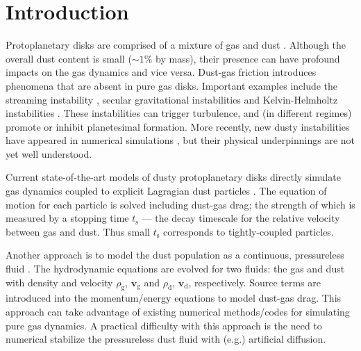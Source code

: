 \documentclass[iop, numberedappendix]{emulateapj}
\newcommand{\rhod}{\rho_\mathrm{d}}
\newcommand{\rhog}{\rho_\mathrm{g}}
\newcommand{\tstop}{t_\mathrm{s}}
\begin{document}
\section{Introduction}
Protoplanetary disks are comprised of a mixture of gas and dust
\citep{chiang10}. Although the overall dust content is small
($\sim 1\%$ by mass), their presence can have profound impacts on the 
gas dynamics and vice versa. Dust-gas friction introduces phenomena
that are absent in pure gas disks. Important examples include the
streaming instability 
\citep[SI,][]{youdin05a,youdin07b,johansen07}, secular gravitational
instabilities \citep[SGI,][]{ward00,youdin11,michikoshi12,takahashi14} and
Kelvin-Helmholtz instabilities
\citep{goldreich1973, chiang08,barranco09,lee10}. These instabilities 
can trigger turbulence, and (in different regimes) promote or inhibit 
planetesimal formation. 
More recently, new 
dusty instabilities have appeared in numerical
simulations \citep{loren15,loren16,lamb16}, but their physical underpinnings are not yet well
understood. 



Current state-of-the-art models of dusty protoplanetary
disks directly simulate gas dynamics coupled to explicit
Lagragian dust particles
\citep{johansen2006, nelson10,bai10,yang14,zhu14,gibbons15,simon16,baruteau16}. 
The equation of motion for each particle is solved 
including dust-gas drag; the strength of which is measured 
by a stopping time $\tstop$ --- the decay timescale for the 
relative velocity between gas and dust. Thus small $\tstop$
corresponds to tightly-coupled particles. 


Another approach is to model the dust population as a continuous, pressureless
fluid 
\citep{paardekooper06b,meheut12,laibe12,loren14,fu14b,surville16}. The 
hydrodynamic equations are evolved for two fluids: the gas and dust with density and
velocity $\rhog$, $\bm{v}_\mathrm{g}$ and $\rhod$, 
$\bm{v}_\mathrm{d}$, respectively. Source terms are introduced into
the momentum/energy equations to model dust-gas drag. This approach
can take advantage of existing numerical methods/codes for
simulating pure gas dynamics. A practical difficulty with this approach is the need to numerical stabilize the pressureless dust fluid with (e.g.) artificial diffusion.


\end{document}
